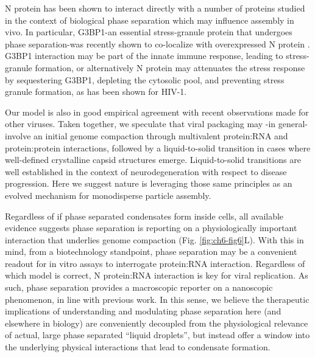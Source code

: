 \documentclass[../main.tex]{subfiles}
\begin{document}
        N protein has been shown to interact directly with a number of proteins studied in the context of biological phase separation which may influence assembly in vivo\cite{Gordon2020-sg,Iserman2020-xm,Martin2020-yc,Sanders2020-tl,Luo2005-qs}. In particular, G3BP1-an essential stress-granule protein that undergoes phase separation-was recently shown to co-localize with overexpressed N protein \cite{Savastano2020-zf,Guillen-Boixet2020-sn,Sanders2020-tl,Yang2020-iq}. G3BP1 interaction may be part of the innate immune response, leading to stress-granule formation, or alternatively N protein may attenuates the stress response by sequestering G3BP1, depleting the cytosolic pool, and preventing stress granule formation, as has been shown for HIV-1\cite{Monette2020-do}.

        Our model is also in good empirical agreement with recent observations made for other viruses\cite{Van_Rosmalen2020-kk}. Taken together, we speculate that viral packaging may -in general- involve an initial genome compaction through multivalent protein:RNA and protein:protein interactions, followed by a liquid-to-solid transition in cases where well-defined crystalline capsid structures emerge. Liquid-to-solid transitions are well established in the context of neurodegeneration with respect to disease progression\cite{Patel2015-hh,Alberti2019-zm,Weber2012-ga}. Here we suggest nature is leveraging those same principles as an evolved mechanism for monodisperse particle assembly.

        Regardless of if phase separated condensates form inside cells, all available evidence suggests phase separation is reporting on a physiologically important interaction that underlies genome compaction (Fig. \ref{fig:ch6-fig6}L). With this in mind, from a biotechnology standpoint, phase separation may be a convenient readout for in vitro assays to interrogate protein:RNA interaction. Regardless of which model is correct, N protein:RNA interaction is key for viral replication. As such, phase separation provides a macroscopic reporter on a nanoscopic phenomenon, in line with previous work\cite{Martin2020-yc,Rubinstein2003-fa,Zeng2020-ko,Dignon2018-jf}. In this sense, we believe the therapeutic implications of understanding and modulating phase separation here (and elsewhere in biology) are conveniently decoupled from the physiological relevance of actual, large phase separated “liquid droplets”, but instead offer a window into the underlying physical interactions that lead to condensate formation.
\end{document}
